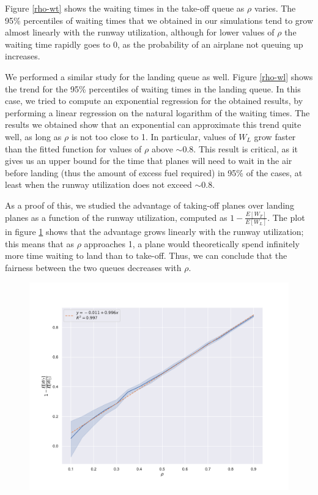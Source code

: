 \documentclass[12pt]{article}
\begin{document}
Figure \ref{rho-wt} shows the waiting times in the take-off queue as $\rho$ varies. The 95\% percentiles of waiting times that we obtained in our simulations tend to grow almost linearly with the runway utilization, although for lower values of $\rho$ the waiting time rapidly goes to 0, as the probability of an airplane not queuing up increases.

We performed a similar study for the landing queue as well. Figure \ref{rho-wl} shows the trend for the 95\% percentiles of waiting times in the landing queue. In this case, we tried to compute an exponential regression for the obtained results, by performing a linear regression on the natural logarithm of the waiting times. The results we obtained show that an exponential can approximate this trend quite well, as long as $\rho$ is not too close to 1. In particular, values of $W_L$ grow faster than the fitted function for values of $\rho$ above $\sim 0.8$. This result is critical, as it gives us an upper bound for the time that planes will need to wait in the air before landing (thus the amount of excess fuel required) in 95\% of the cases, at least when the runway utilization does not exceed $\sim 0.8$.

As a proof of this, we studied the advantage of taking-off planes over landing planes as a function of the runway utilization, computed as $1 - \tfrac{E[W_T]}{E[W_L]}$. The plot in figure \ref{rho-adv} shows that the advantage grows linearly with the runway utilization; this means that as $\rho$ approaches 1, a plane would theoretically spend infinitely more time waiting to land than to take-off. Thus, we can conclude that the fairness between the two queues decreases with $\rho$.

\begin{figure}[H]
	\centering
	\includegraphics[width=.8\textwidth]{report/immagini/rho_adv.pdf}
	\caption{}
	\label{rho-adv}
\end{figure}
\end{document}
